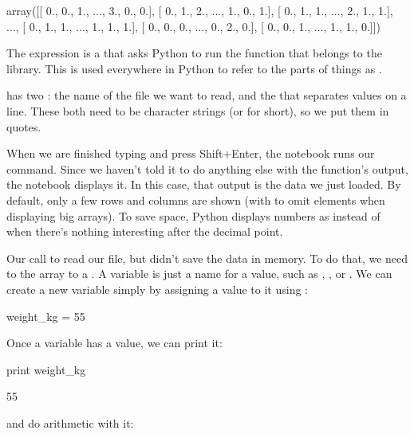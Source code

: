 \begin{VerbOut}
array([[ 0.,  0.,  1., ...,  3.,  0.,  0.],
       [ 0.,  1.,  2., ...,  1.,  0.,  1.],
       [ 0.,  1.,  1., ...,  2.,  1.,  1.],
       ...,
       [ 0.,  1.,  1., ...,  1.,  1.,  1.],
       [ 0.,  0.,  0., ...,  0.,  2.,  0.],
       [ 0.,  0.,  1., ...,  1.,  1.,  0.]])
\end{VerbOut}

The expression  is a
 that asks Python to run the
function  that belongs to the  library.
This  is used everywhere in
Python to refer to the parts of things as .

 has two : the
name of the file we want to read, and the
 that separates values on a line. These
both need to be character strings (or  for
short), so we put them in quotes.

When we are finished typing and press Shift+Enter, the notebook runs our
command. Since we haven't told it to do anything else with the
function's output, the notebook displays it. In this case, that output
is the data we just loaded. By default, only a few rows and columns are
shown (with  to omit elements when displaying big arrays).
To save space, Python displays numbers as  instead of
 when there's nothing interesting after the decimal point.

Our call to  read our file, but didn't save the
data in memory. To do that, we need to 
the array to a . A variable is just a
name for a value, such as , , or
. We can create a new variable simply by assigning a
value to it using \code{=}:

\begin{VerbIn}
weight_kg = 55
\end{VerbIn}

Once a variable has a value, we can print it:

\begin{VerbIn}
print weight_kg
\end{VerbIn}

\begin{VerbOut}
55
\end{VerbOut}

and do arithmetic with it:

